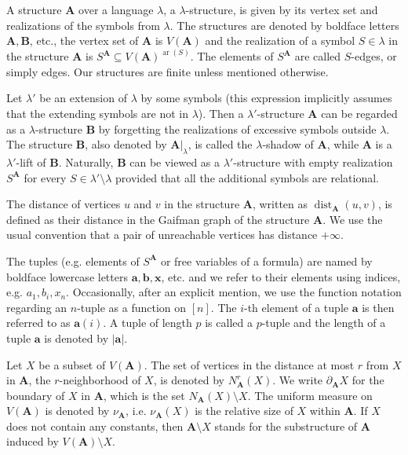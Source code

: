 \documentclass[11pt]{article}
\theoremstyle{plain}
\theoremstyle{definition}
\theoremstyle{remark}
\DeclareMathOperator\dist{dist}
\DeclareMathOperator\aritysym{ar}
\newcommand{\arity}[1]{{\aritysym({#1})}}
\newcommand{\str}[1]{\mathbf{#1}}
\newcommand{\tpl}[1]{{\bm{#1}}}
\begin{document}
A structure $\str{A}$ over a language $\lambda$, a $\lambda$-structure, is given by its vertex set and realizations of the symbols from $\lambda$.
The structures are denoted by boldface letters $\str{A}, \str{B}$, etc., the vertex set of $\str{A}$ is $V(\str{A})$ and the realization of a symbol $S \in \lambda$ in the structure $\str{A}$ is $S^\str{A} \subseteq V(\str{A})^{\arity{S}}$.
The elements of $S^\str{A}$ are called $S$-edges, or simply edges.
Our structures are finite unless mentioned otherwise.

Let $\lambda'$ be an extension of $\lambda$ by some symbols (this expression implicitly assumes that the extending symbols are not in $\lambda$).
Then a $\lambda'$-structure $\str{A}$ can be regarded as a $\lambda$-structure $\str{B}$ by forgetting the realizations of excessive symbols outside $\lambda$.
The structure $\str{B}$, also denoted by $\str{A}|_\lambda$, is called the $\lambda$-shadow of $\str{A}$, while $\str{A}$ is a $\lambda'$-lift of $\str{B}$.
Naturally, $\str{B}$ can be viewed as a $\lambda'$-structure with empty realization $S^\str{A}$ for every $S \in \lambda' \setminus \lambda$ provided that all the additional symbols are relational.

The distance of vertices $u$ and $v$ in the structure $\str{A}$, written as $\dist_\str{A}(u,v)$, is defined as their distance in the Gaifman graph of the structure $\str{A}$.
We use the usual convention that a pair of unreachable vertices has distance $+\infty$.

The tuples (e.g. elements of $S^\str{A}$ or free variables of a formula) are named by boldface lowercase letters $\tpl{a}, \tpl{b}, \tpl{x}$, etc. and we refer to their elements using indices, e.g. $a_1, b_i, x_n$.
Occasionally, after an explicit mention, we use the function notation regarding an $n$-tuple as a function on $[n]$.
The $i$-th element of a tuple $\tpl{a}$ is then referred to as $\tpl{a}(i)$.
A tuple of length $p$ is called a $p$-tuple and the length of a tuple $\tpl{a}$ is denoted by $|\tpl{a}|$.

Let $X$ be a subset of $V(\str{A})$.
The set of vertices in the distance at most $r$ from $X$ in $\str{A}$, the $r$-neighborhood of $X$, is denoted by $N_\str{A}^r(X)$.
We write $\partial_\str{A} X$ for the boundary of $X$ in $\str{A}$, which is the set $N_\str{A}(X) \setminus X$.
The uniform measure on $V(\str{A})$ is denoted by $\nu_\str{A}$, i.e. $\nu_\str{A}(X)$ is the relative size of $X$ within $\str{A}$.
If $X$ does not contain any constants, then $\str{A} \setminus X$ stands for the substructure of $\str{A}$ induced by $V(\str{A}) \setminus X$.
\end{document}
